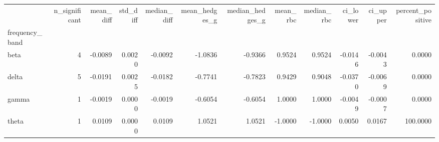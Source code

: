 \begin{tabular}{lrrrrrrrrrrr}
\toprule
 & n\_significant & mean\_diff & std\_diff & median\_diff & mean\_hedges\_g & median\_hedges\_g & mean\_rbc & median\_rbc & ci\_lower & ci\_upper & percent\_positive \\
frequency\_band &  &  &  &  &  &  &  &  &  &  &  \\
\midrule
beta & 4 & -0.0089 & 0.0020 & -0.0092 & -1.0836 & -0.9366 & 0.9524 & 0.9524 & -0.0146 & -0.0043 & 0.0000 \\
delta & 5 & -0.0191 & 0.0025 & -0.0182 & -0.7741 & -0.7823 & 0.9429 & 0.9048 & -0.0370 & -0.0069 & 0.0000 \\
gamma & 1 & -0.0019 & 0.0000 & -0.0019 & -0.6054 & -0.6054 & 1.0000 & 1.0000 & -0.0049 & -0.0007 & 0.0000 \\
theta & 1 & 0.0109 & 0.0000 & 0.0109 & 1.0521 & 1.0521 & -1.0000 & -1.0000 & 0.0050 & 0.0167 & 100.0000 \\
\bottomrule
\end{tabular}
